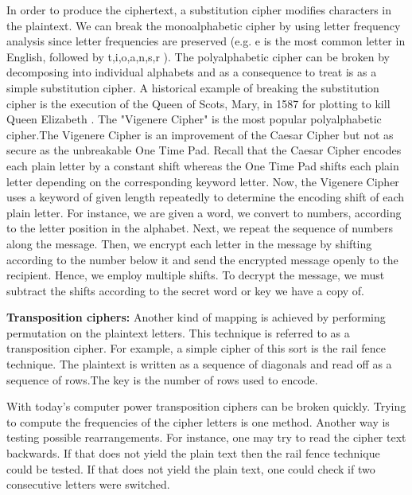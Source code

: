 In order to produce the ciphertext, a substitution cipher modifies characters in the plaintext. We can break the monoalphabetic cipher by using letter frequency analysis since letter frequencies are preserved (e.g. e is the most common letter in English, followed by t,i,o,a,n,s,r ). The polyalphabetic cipher can be broken by decomposing into individual alphabets and as a consequence to treat is as a simple substitution cipher. A historical example of breaking the substitution cipher is the execution of the Queen of Scots, Mary, in 1587 for plotting to kill Queen Elizabeth \cite{maryscots}. The "Vigenere Cipher" is the most popular polyalphabetic cipher.The Vigenere Cipher is an improvement of the Caesar Cipher but not as secure as the unbreakable One Time Pad. Recall that the Caesar Cipher encodes each plain letter by a constant shift whereas the One Time Pad shifts each plain letter depending on the corresponding keyword letter. Now, the Vigenere Cipher uses a keyword of given length repeatedly to determine the encoding shift of each plain letter. For instance, we are given a word, we convert to numbers, according to the letter position in the alphabet. Next, we repeat the sequence of numbers along the message. Then, we encrypt each letter in the message by shifting according to the number below it and send the encrypted message openly to the recipient. Hence, we employ multiple shifts. To decrypt the message, we must subtract the shifts according to the secret word or key we have a copy of.

\textbf{Transposition ciphers:} Another kind of mapping is achieved by performing permutation on the plaintext letters. This technique is referred to as a transposition cipher. For example, a simple cipher of this sort is the rail fence technique. The plaintext is written as a sequence of diagonals and read off as a sequence of rows.The key is the number of rows used to encode. 

With today's computer power transposition ciphers can be broken quickly. Trying to compute the frequencies of the cipher letters is one method. Another way is testing possible rearrangements. For instance, one may try to read the cipher text backwards. If that does not yield the plain text then the rail fence technique could be tested. If that does not yield the plain text, one could check if two consecutive letters were switched.    

